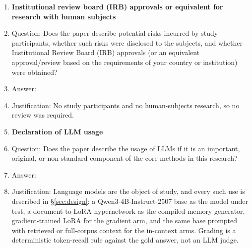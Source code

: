 \begin{enumerate}
\item {\bf Institutional review board (IRB) approvals or equivalent for research
with human subjects}
    \item[] Question: Does the paper describe potential risks incurred by study
    participants, whether such risks were disclosed to the subjects, and whether
    Institutional Review Board (IRB) approvals (or an equivalent approval/review
    based on the requirements of your country or institution) were obtained?
    \item[] Answer: \answerNA{}
    \item[] Justification: No study participants and no human-subjects research,
    so no review was required.

\item {\bf Declaration of LLM usage}
    \item[] Question: Does the paper describe the usage of LLMs if it is an
    important, original, or non-standard component of the core methods in this
    research?
    \item[] Answer: \answerYes{}
    \item[] Justification: Language models are the object of study, and every
    such use is described in \S\ref{sec:design}: a Qwen3-4B-Instruct-2507 base as the
    model under test, a document-to-LoRA hypernetwork as the compiled-memory
    generator, gradient-trained LoRA for the gradient arm, and the same base
    prompted with
    retrieved or full-corpus context for the in-context arms. Grading is a
    deterministic token-recall rule against the gold answer, not an LLM judge.

\end{enumerate}
